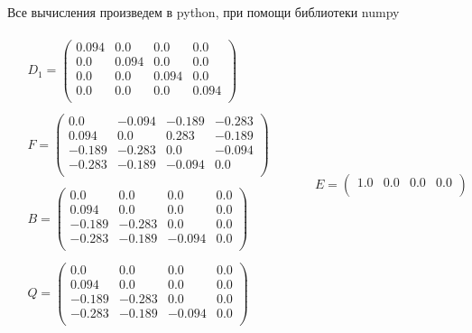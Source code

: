 \documentclass[letterpaper, 11pt]{extarticle}
\begin{document}
\noindent Все вычисления произведем в python, при помощи библиотеки numpy

\begin{align*}
    \begin{aligned}
        & D_1 = \begin{pmatrix}
            0.094 & 0.0 & 0.0 & 0.0 \\
            0.0 & 0.094 & 0.0 & 0.0 \\
            0.0 & 0.0 & 0.094 & 0.0 \\
            0.0 & 0.0 & 0.0 & 0.094 \\
        \end{pmatrix}\\\\
        & F = \begin{pmatrix}
            0.0 & -0.094 & -0.189 & -0.283 \\
            0.094 & 0.0 & 0.283 & -0.189 \\
            -0.189 & -0.283 & 0.0 & -0.094 \\
            -0.283 & -0.189 & -0.094 & 0.0 \\
        \end{pmatrix}\\\\
        & B = \begin{pmatrix}
            0.0 & 0.0 & 0.0 & 0.0 \\
            0.094 & 0.0 & 0.0 & 0.0 \\
            -0.189 & -0.283 & 0.0 & 0.0 \\
            -0.283 & -0.189 & -0.094 & 0.0 \\
        \end{pmatrix}\\\\
        & Q = \begin{pmatrix}
            0.0 & 0.0 & 0.0 & 0.0 \\
            0.094 & 0.0 & 0.0 & 0.0 \\
            -0.189 & -0.283 & 0.0 & 0.0 \\
            -0.283 & -0.189 & -0.094 & 0.0 \\
        \end{pmatrix}\\
    \end{aligned}
    \qquad
    \begin{aligned}
        & E = \begin{pmatrix}
            1.0 & 0.0 & 0.0 & 0.0 \\

\end{pmatrix}
\end{aligned}
\end{align*}
\end{document}
